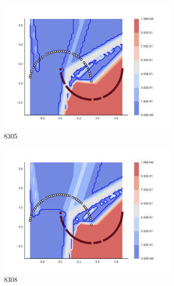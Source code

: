 \begin{figure}[h]
\begin{subfigure}[b]{0.09\textwidth}
    \includegraphics[clip, trim=2.35cm 1.75cm 4.5cm 0cm,width=\textwidth]{img/convergence/8305.pdf}
    \caption{8305}
    \label{fig:convergence_8305}
\end{subfigure}
%
\begin{subfigure}[b]{0.09\textwidth}
    \includegraphics[clip, trim=2.35cm 1.75cm 4.5cm 0cm,width=\textwidth]{img/convergence/8308.pdf}
    \caption{8308}
    \label{fig:convergence_8308}
\end{subfigure}
%
\begin{subfigure}[b]{0.09\textwidth}

\end{subfigure}
\end{figure}
